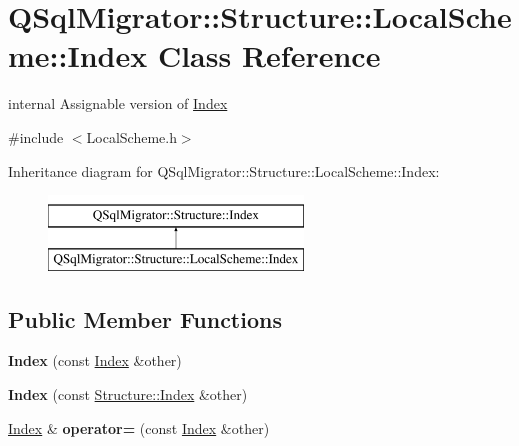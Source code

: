 \hypertarget{class_q_sql_migrator_1_1_structure_1_1_local_scheme_1_1_index}{}\section{Q\+Sql\+Migrator\+:\+:Structure\+:\+:Local\+Scheme\+:\+:Index Class Reference}
\label{class_q_sql_migrator_1_1_structure_1_1_local_scheme_1_1_index}


internal Assignable version of \hyperlink{class_q_sql_migrator_1_1_structure_1_1_local_scheme_1_1_index}{Index}  




{\ttfamily \#include $<$Local\+Scheme.\+h$>$}

Inheritance diagram for Q\+Sql\+Migrator\+:\+:Structure\+:\+:Local\+Scheme\+:\+:Index\+:\begin{figure}[H]
\begin{center}
\leavevmode
\includegraphics[height=2.000000cm]{class_q_sql_migrator_1_1_structure_1_1_local_scheme_1_1_index}
\end{center}
\end{figure}
\subsection*{Public Member Functions}
\begin{DoxyCompactItemize}
\item 
\mbox{\label{class_q_sql_migrator_1_1_structure_1_1_local_scheme_1_1_index_a213ba698de45cac71bf542e74fec4dd4}} 
{\bfseries Index} (const \hyperlink{class_q_sql_migrator_1_1_structure_1_1_local_scheme_1_1_index}{Index} \&other)
\item 
\mbox{\label{class_q_sql_migrator_1_1_structure_1_1_local_scheme_1_1_index_a8c333c7302935a906f3a99d556e6778b}} 
{\bfseries Index} (const \hyperlink{class_q_sql_migrator_1_1_structure_1_1_index}{Structure\+::\+Index} \&other)
\item 
\mbox{\label{class_q_sql_migrator_1_1_structure_1_1_local_scheme_1_1_index_a77d103ab51fff050ee87a9bb1cf1857e}} 
\hyperlink{class_q_sql_migrator_1_1_structure_1_1_local_scheme_1_1_index}{Index} \& {\bfseries operator=} (const \hyperlink{class_q_sql_migrator_1_1_structure_1_1_local_scheme_1_1_index}{Index} \&other)
\end{DoxyCompactItemize}
